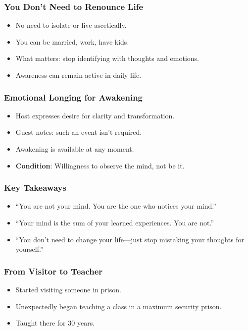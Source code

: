 \begin{frame}[fragile]\frametitle{You Don’t Need to Renounce Life}
  \begin{itemize}
    \item No need to isolate or live ascetically.
    \item You can be married, work, have kids.
    \item What matters: stop identifying with thoughts and emotions.
    \item Awareness can remain active in daily life.
  \end{itemize}
\end{frame}

\begin{frame}[fragile]\frametitle{Emotional Longing for Awakening}
  \begin{itemize}
    \item Host expresses desire for clarity and transformation.
    \item Guest notes: such an event isn’t required.
    \item Awakening is available at any moment.
    \item \textbf{Condition}: Willingness to observe the mind, not be it.
  \end{itemize}
\end{frame}

\begin{frame}[fragile]\frametitle{Key Takeaways}
  \begin{itemize}
    \item “You are not your mind. You are the one who notices your mind.”
    \item “Your mind is the sum of your learned experiences. You are not.”
    \item “You don’t need to change your life—just stop mistaking your thoughts for yourself.”
  \end{itemize}
\end{frame}

\begin{frame}[fragile]\frametitle{From Visitor to Teacher}
  \begin{itemize}
    \item Started visiting someone in prison.
    \item Unexpectedly began teaching a class in a maximum security prison.
    \item Taught there for 30 years.
  \end{itemize}
\end{frame}

